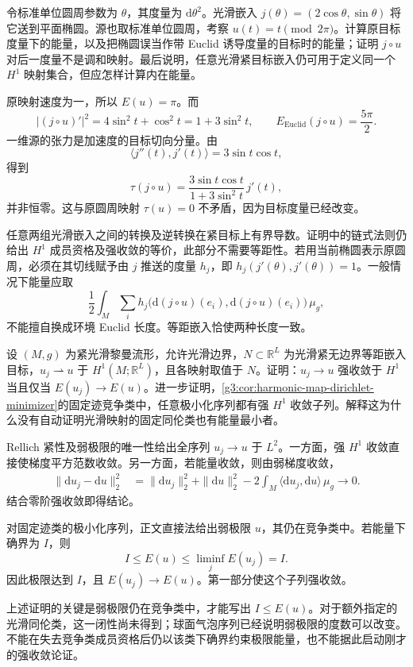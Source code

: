 \begin{exercise}\label{g3:ex:nonisometric-target-embedding}
	令标准单位圆周参数为 \(\theta\)，其度量为 \(\mathrm d\theta^2\)。光滑嵌入 \(j(\theta)=(2\cos\theta,\sin\theta)\) 将它送到平面椭圆。源也取标准单位圆周，考察 \(u(t)=t\pmod{2\pi}\)。计算原目标度量下的能量，以及把椭圆误当作带 Euclid 诱导度量的目标时的能量；证明 \(j\circ u\) 对后一度量不是调和映射。最后说明，任意光滑紧目标嵌入仍可用于定义同一个 \(H^1\) 映射集合，但应怎样计算内在能量。
\end{exercise}
\begin{solution}
	原映射速度为一，所以 \(E(u)=\pi\)。而
	\[
		|(j\circ u)'|^2=4\sin^2t+\cos^2t=1+3\sin^2t,
		\qquad E_{\mathrm{Euclid}}(j\circ u)=\frac{5\pi}{2}.
	\]
	一维源的张力是加速度的目标切向分量。由
	\[
		\langle j''(t),j'(t)\rangle=3\sin t\cos t,
	\]
	得到
	\[
		\tau(j\circ u)=\frac{3\sin t\cos t}{1+3\sin^2t}\,j'(t),
	\]
	并非恒零。这与原圆周映射 \(\tau(u)=0\) 不矛盾，因为目标度量已经改变。

	任意两组光滑嵌入之间的转换及逆转换在紧目标上有界导数。证明中的链式法则仍给出 \(H^1\) 成员资格及强收敛的等价，此部分不需要等距性。若用当前椭圆表示原圆周，必须在其切线赋予由 \(j\) 推送的度量 \(h_j\)，即 \(h_j(j'(\theta),j'(\theta))=1\)。一般情况下能量应取
	\[
		\frac12\int_M\sum_i h_j\bigl(\mathrm d(j\circ u)(e_i),\mathrm d(j\circ u)(e_i)\bigr)\,\mu_g,
	\]
	不能擅自换成环境 Euclid 长度。等距嵌入恰使两种长度一致。
\end{solution}

\begin{exercise}\label{g3:ex:energy-convergence-strong-map}
	设 \((M,g)\) 为紧光滑黎曼流形，允许光滑边界，\(N\subset\mathbb R^L\) 为光滑紧无边界等距嵌入目标，\(u_j\rightharpoonup u\) 于 \(H^1(M;\mathbb R^L)\)，且各映射取值于 \(N\)。证明：\(u_j\to u\) 强收敛于 \(H^1\) 当且仅当 \(E(u_j)\to E(u)\)。进一步证明，\cref{g3:cor:harmonic-map-dirichlet-minimizer}的固定迹竞争类中，任意极小化序列都有强 \(H^1\) 收敛子列。解释这为什么没有自动证明光滑映射的固定同伦类也有能量最小者。
\end{exercise}
\begin{solution}
	Rellich 紧性及弱极限的唯一性给出全序列 \(u_j\to u\) 于 \(L^2\)。一方面，强 \(H^1\) 收敛直接使梯度平方范数收敛。另一方面，若能量收敛，则由弱梯度收敛，
	\[
	\begin{aligned}
		\|\mathrm du_j-\mathrm du\|_2^2
		&=\|\mathrm du_j\|_2^2+\|\mathrm du\|_2^2
		-2\int_M\langle\mathrm du_j,\mathrm du\rangle\,\mu_g
		\longrightarrow0.
	\end{aligned}
	\]
	结合零阶强收敛即得结论。

	对固定迹类的极小化序列，正文直接法给出弱极限 \(u\)，其仍在竞争类中。若能量下确界为 \(I\)，则
	\[
		I\le E(u)\le\liminf_jE(u_j)=I.
	\]
	因此极限达到 \(I\)，且 \(E(u_j)\to E(u)\)。第一部分使这个子列强收敛。

	上述证明的关键是弱极限仍在竞争类中，才能写出 \(I\le E(u)\)。对于额外指定的光滑同伦类，这一闭性尚未得到；球面气泡序列已经说明弱极限的度数可以改变。不能在失去竞争类成员资格后仍以该类下确界约束极限能量，也不能据此启动刚才的强收敛论证。
\end{solution}

